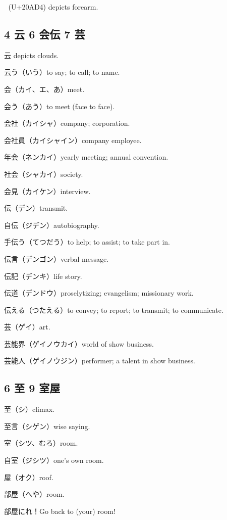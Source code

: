 𠫔 (U+20AD4) depicts forearm.

\subsection{4 云 6 会伝 7 芸}

云 depicts clouds.

云う（いう）to say; to call; to name.

会（カイ、エ、あ）meet.

会う（あう）to meet (face to face).

会社（カイシャ）company; corporation.

会社員（カイシャイン）company employee.

年会（ネンカイ）yearly meeting; annual convention.

社会（シャカイ）society.

会見（カイケン）interview.

伝（デン）transmit.

自伝（ジデン）autobiography.

手伝う（てつだう）to help; to assist; to take part in.

伝言（デンゴン）verbal message.

伝記（デンキ）life story.

伝道（デンドウ）proselytizing; evangelism; missionary work.

伝える（つたえる）to convey; to report; to transmit; to communicate.

芸（ゲイ）art.

芸能界（ゲイノウカイ）world of show business.

芸能人（ゲイノウジン）performer; a talent in show business.

\subsection{6 至 9 室屋}

至（シ）climax.

至言（シゲン）wise saying.

室（シツ、むろ）room.

自室（ジシツ）one's own room.

屋（オク）roof.

部屋（へや）room.

部屋にれ！Go back to (your) room!
